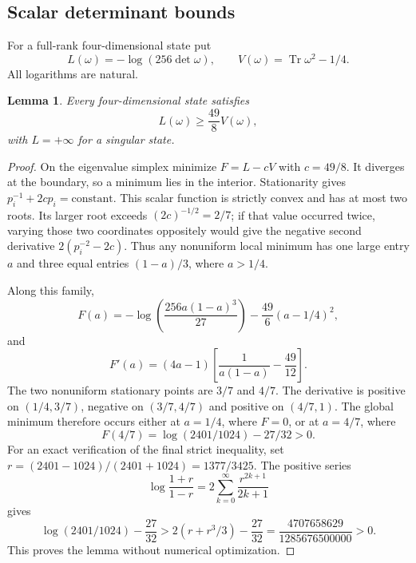 \documentclass[11pt,a4paper]{article}
\newcommand{\Tr}{\operatorname{Tr}}
\newtheorem{lemma}{Lemma}
\begin{document}
\subsection{Scalar determinant bounds}
For a full-rank four-dimensional state put
\[
 L(\omega)=-\log(256\det\omega),\qquad
 V(\omega)=\Tr\omega^2-1/4.
\]
All logarithms are natural.

\begin{lemma}\label{t3:lem:lower}
Every four-dimensional state satisfies
\[
 L(\omega)\ge\frac{49}{8}V(\omega),
\]
with $L=+\infty$ for a singular state.
\end{lemma}
\begin{proof}
On the eigenvalue simplex minimize $F=L-cV$ with $c=49/8$.
It diverges at the boundary, so a minimum lies in the interior.
Stationarity gives $p_i^{-1}+2cp_i=\mathrm{constant}$.
This scalar function is strictly convex and has at most two roots.
Its larger root exceeds $(2c)^{-1/2}=2/7$; if that value occurred
twice, varying those two coordinates oppositely would give the
negative second derivative $2(p_i^{-2}-2c)$.
Thus any nonuniform local minimum has one large entry $a$ and
three equal entries $(1-a)/3$, where $a>1/4$.

Along this family,
\[
 F(a)=-\log\!\left(\frac{256a(1-a)^3}{27}\right)
       -\frac{49}{6}(a-1/4)^2,
\]
and
\[
 F'(a)=(4a-1)\left[\frac1{a(1-a)}-\frac{49}{12}\right].
\]
The two nonuniform stationary points are $3/7$ and $4/7$.
The derivative is positive on $(1/4,3/7)$, negative on
$(3/7,4/7)$ and positive on $(4/7,1)$. The global minimum
therefore occurs either at $a=1/4$, where $F=0$, or at $a=4/7$,
where
\[
 F(4/7)=\log(2401/1024)-27/32>0.
\]
For an exact verification of the final strict inequality, set
$r=(2401-1024)/(2401+1024)=1377/3425$. The positive series
\[
 \log\frac{1+r}{1-r}=2\sum_{k=0}^\infty\frac{r^{2k+1}}{2k+1}
\]
gives
\[
 \log(2401/1024)-\frac{27}{32}
 >2(r+r^3/3)-\frac{27}{32}
 =\frac{4707658629}{1285676500000}>0.
\]
This proves the lemma without numerical optimization.
\end{proof}
\end{document}
